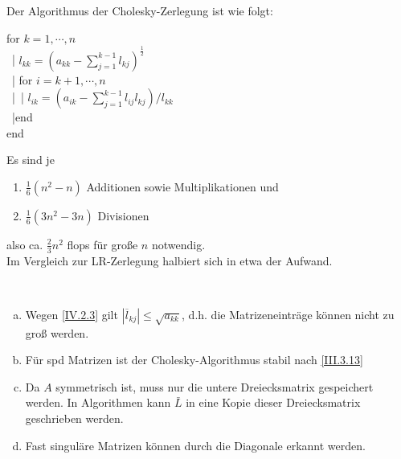 Der Algorithmus der Cholesky-Zerlegung ist wie folgt:

\begin{pseudocode}{0.55\linewidth}
  for  $k=1, \cdots , n$\\
  ~|\> $l_{kk} = (a_{kk}-\sum_{j=1}^{k-1}l_{kj})^{\frac{1}{2}}$ \\
  ~|\> for $i= k+1, \cdots , n$ \\
  ~|\>~|\> $l_{ik} = ( a_{ik}- \sum_{j=1}^{k-1}l_{ij} l_{kj})/{l_{kk}}$  \\
  ~|\>end\\
  end
\end{pseudocode}



Es sind je 
\begin{enumerate}
\item[] $\frac{1}{6}(n^2-n) $ Additionen sowie Multiplikationen und 
\item[]  $\frac{1}{6}(3n^2-3n) $ Divisionen 
\end{enumerate}
also ca. $\frac{2}{3} n^2$ flops für große $n$ notwendig. \\
Im Vergleich zur LR-Zerlegung halbiert sich in etwa der Aufwand.

\begin{Beme}~
  \begin{enumerate}[a)]
  \item Wegen \eqref{IV.2.3} gilt $|\overline{l}_{kj}| \leq \sqrt{a_{kk}}$,
    d.h. die Matrizeneinträge können nicht zu groß werden.
  \item Für spd Matrizen ist der Cholesky-Algorithmus stabil nach \eqref{III.3.13}
  \item Da $A$ symmetrisch ist, muss nur die untere Dreiecksmatrix gespeichert werden.
    In Algorithmen kann $\bar{L}$ in eine Kopie dieser Dreiecksmatrix geschrieben werden.
  \item Fast singuläre Matrizen können durch die Diagonale erkannt werden.
  \end{enumerate}
\end{Beme}


 


